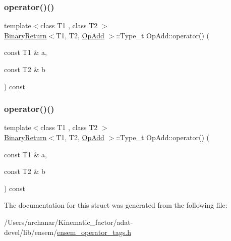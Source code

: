 \mbox{\label{structOpAdd_a1eeb43f9d50d80994b1d2fe141bca73b}} 
\subsubsection{\texorpdfstring{operator()()}{operator()()}\hspace{0.1cm}{\footnotesize\ttfamily [2/3]}}
{\footnotesize\ttfamily template$<$class T1 , class T2 $>$ \\
\mbox{\hyperlink{structBinaryReturn}{Binary\+Return}}$<$T1, T2, \mbox{\hyperlink{structOpAdd}{Op\+Add}} $>$\+::Type\+\_\+t Op\+Add\+::operator() (\begin{DoxyParamCaption}\item[{const T1 \&}]{a,  }\item[{const T2 \&}]{b }\end{DoxyParamCaption}) const\hspace{0.3cm}{\ttfamily [inline]}}

\mbox{\label{structOpAdd_a1eeb43f9d50d80994b1d2fe141bca73b}} 
\subsubsection{\texorpdfstring{operator()()}{operator()()}\hspace{0.1cm}{\footnotesize\ttfamily [3/3]}}
{\footnotesize\ttfamily template$<$class T1 , class T2 $>$ \\
\mbox{\hyperlink{structBinaryReturn}{Binary\+Return}}$<$T1, T2, \mbox{\hyperlink{structOpAdd}{Op\+Add}} $>$\+::Type\+\_\+t Op\+Add\+::operator() (\begin{DoxyParamCaption}\item[{const T1 \&}]{a,  }\item[{const T2 \&}]{b }\end{DoxyParamCaption}) const\hspace{0.3cm}{\ttfamily [inline]}}



The documentation for this struct was generated from the following file\+:\begin{DoxyCompactItemize}
\item 
/\+Users/archanar/\+Kinematic\+\_\+factor/adat-\/devel/lib/ensem/\mbox{\hyperlink{adat-devel_2lib_2ensem_2ensem__operator__tags_8h}{ensem\+\_\+operator\+\_\+tags.\+h}}\end{DoxyCompactItemize}
